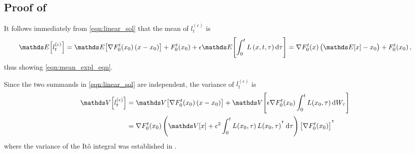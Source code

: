 \subsection{Proof of }\label{app:limit_moments_proof}
It follows immediately from \eqref{eqn:linear_sol} that the mean of \(l_t^{(\epsilon)}\) is
\[
	\avg{l_t^{(\epsilon)}} = \avg{\nabla F_0^t\!\left(x_0\right) \left(x - x_0\right)} + F_0^t\!\left(x_0\right) + \epsilon \avg{\int_0^t{L\left(x,t,\tau\right)\dif\tau}} = \nabla F_0^t(x) \left(\avg{x} - x_0\right) + F_0^t\!\left(x_0\right),
\]
thus showing \eqref{eqn:mean_expl_eqn}.

Since the two summands in \eqref{eqn:linear_sol} are independent, the variance of \(l_t^{(\epsilon)}\) is
\begin{align*}
	\var{l_t^{(\epsilon)}} & = \var{\nabla F_0^t\!\left(x_0\right) \left(x - x_0\right)} + \var{\epsilon \nabla F_0^t\!\left(x_0\right)\int_0^t{L\!\left(x_0,\tau\right)\dif W_\tau}}                                      \\
	                       & = \nabla F_0^t\!\left(x_0\right) \left(\var{x} + \epsilon^2\int_0^t{L\!\left(x_0, \tau\right)L\!\left(x_0, \tau\right)^{\T} \dif\tau}\right) \left[\nabla F_0^t\!\left(x_0\right)\right]^{\T}
\end{align*}
where the variance of the It\^o integral was established in .

